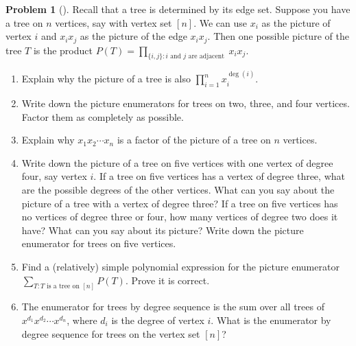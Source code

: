 \documentclass[10pt,]{book}
\theoremstyle{plain}
\theoremstyle{definition}
\newtheorem{activity}[project]{Problem}
\theoremstyle{definition}
\numberwithin{equation}{chapter}
\newcommand{\importantarrow}{\Rightarrow}
\begin{document}
\begin{activity}[]\marginsymbol[-1em]{\pdftooltip{$\importantarrow$}{especially interesting}} \label{activity-199}
Recall that a tree is determined by its edge set. Suppose you have a tree on \(n\) vertices, say with vertex set \([n]\). We can use \(x_i\) as the picture of vertex \(i\) and \(x_ix_j\) as the picture of the edge \(x_ix_j\). Then one possible picture of the tree \(T\) is the product \(P(T) = \prod_{\{i,j\}:i\text{ and }j\text{ are adjacent }}x_ix_j\).%
\begin{enumerate}[font=\bfseries,label=(\alph*),ref=\alph*]
\item\label{task-133} \marginsymbol[-2.5em]{} Explain why the picture of a tree is also \(\prod_{i=1}^nx_i^{\deg(i)}\).%
\item\label{task-134} \marginsymbol[-2.5em]{} Write down the picture enumerators for trees on two, three, and four vertices. Factor them as completely as possible.%
\item\label{task-135} \marginsymbol[-2.5em]{} Explain why \(x_1x_2\cdots x_n\) is a factor of the picture of a tree on \(n\) vertices.%
\item\label{task-136} \marginsymbol[-2.5em]{} Write down the picture of a tree on five vertices with one vertex of degree four, say vertex \(i\). If a tree on five vertices has a vertex of degree three, what are the possible degrees of the other vertices. What can you say about the picture of a tree with a vertex of degree three? If a tree on five vertices has no vertices of degree three or four, how many vertices of degree two does it have? What can you say about its picture? Write down the picture enumerator for trees on five vertices.%
\item\label{task-137} \marginsymbol[-2.5em]{} Find a (relatively) simple polynomial expression for the picture enumerator  \(\sum_{T \colon T\text{ is a tree on }[n]} P (T)\). Prove it is correct.%
\item\label{task-138} \marginsymbol[-2.5em]{} The enumerator for trees by degree sequence is the sum over all trees of \(x^{d_1}x^{d_2} \cdots x^{d_n}\), where \(d_i\) is the degree of vertex \(i\). What is the enumerator by degree sequence for trees on the vertex set \([n]\)?%
\end{enumerate}
\end{activity}
\typeout{************************************************}
\typeout{************************************************}
\end{document}
